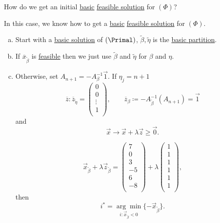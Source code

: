 \begin{problem}\label{prob:phase-one-problem}
How do we get an initial \hyperref[def:basic-solution]{basic} \hyperref[def:feasible-solution]{feasible solution} for \((\Phi)\)?
\end{problem}
\begin{answer}
	In this case, we know how to get a \hyperref[def:basic-solution]{basic} \hyperref[def:feasible-solution]{feasible solution} for \((\Phi)\).
	\begin{enumerate}[(a)]
		\item Start with a \hyperref[def:basic-solution]{basic solution} of \((\Primal)\), \(\tilde{\beta}, \tilde{\eta}\) is the \hyperref[def:basic-partition]{basic partition}.
		\item If \(\overline{x}_{\tilde{\beta}}\) is \hyperref[def:feasible-solution]{feasible} then we just use \(\tilde{\beta}\) and \(\tilde{\eta}\) for \(\beta\) and \(\eta\).
		\item Otherwise, set \(A_{n+1} = -A^{-1}_{\beta}\vec{1}\). If \(\eta_j = n+1\)
		      \[
			      \overline{z} : \overline{z}_{\tilde{\eta}} = \begin{pmatrix}
				      0      \\
				      0      \\
				      \vdots \\
				      1      \\
			      \end{pmatrix},\qquad \overline{z}_{\beta} \coloneqq -A^{-1}_{\tilde{\beta}}(A_{n+1}) = \vec{1}
		      \]
		      and\[
			      \vec{x} \to \vec{x} + \lambda \vec{z} \geq \vec{0}.
		      \] \begin{eg}
			      \[
				      \vec{x}_{\tilde{\beta}} + \lambda \vec{z}_{\tilde{\beta}} = \begin{pmatrix}
					      7  \\
					      0  \\
					      3  \\
					      -5 \\
					      6  \\
					      -8 \\
				      \end{pmatrix} + \lambda \begin{pmatrix}
					      1 \\
					      1 \\
					      1 \\
					      1 \\
					      1 \\
					      1 \\
				      \end{pmatrix},
			      \]
			      then
			      \[
				      i^{\ast} = \underset{i:\vec{x}_{\tilde{\beta}} < 0}{\arg\min}\{-\vec{x}_{\tilde{\beta}}\}.
			      \]
		      \end{eg}
	\end{enumerate}
\end{answer}

